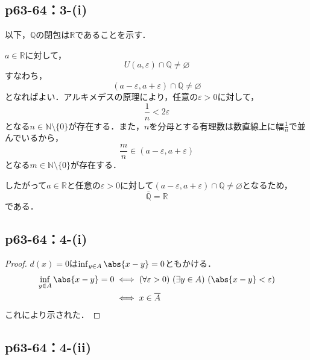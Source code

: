 \documentclass[a4paper,10pt,fleqn]{ltjsarticle}
\begin{document}
\subsection*{p63-64：3-(i)}

\begin{tleftbar}
    以下，$\mathbb{Q}$の閉包は$\mathbb{R}$であることを示す．

    $a \in \mathbb{R}$に対して，
    \[
    U(a,\varepsilon) \cap \mathbb{Q} \ne \varnothing
    \]
    すなわち，
    \[
        (a-\varepsilon,a+\varepsilon) \cap \mathbb{Q} \ne \varnothing
    \]
    となればよい．アルキメデスの原理により，任意の$\varepsilon >0$に対して，
    \[
        \frac{1}{n}< 2\varepsilon 
    \]
    となる$n \in \mathbb{N} \setminus \{0\}$が存在する．また，$n$を分母とする有理数は数直線上に幅$\frac{1}{n}$で並んでいるから，
    \[
        \frac{m}{n} \in (a-\varepsilon,a+\varepsilon)
    \]
    となる$ m \in \mathbb{N} \setminus \{0\}$が存在する．\par 
    したがって$a \in \mathbb{R}$と任意の$\varepsilon>0$に対して$(a-\varepsilon,a+\varepsilon) \cap \mathbb{Q} \ne \varnothing$となるため，
    \[
        \overline{\mathbb{Q}}=\mathbb{R}
    \]
    である．
\end{tleftbar}

\subsection*{p63-64：4-(i)}

\begin{tleftbar}
    \begin{proof}
            $d(x)=0$は$\inf_{y \in A} \abs{x-y} =0$ともかける．
            \begin{align*}
                \inf_{y \in A} \abs{x-y} =0 & \iff (\forall \varepsilon>0) \ (\exists y \in A)\ ( \abs{x-y}<\varepsilon ) \\
                & \iff x \in \overline{A}
            \end{align*}
            これにより示された．
        \end{proof}
    \end{tleftbar}


 \subsection*{p63-64：4-(ii)}
    
\end{document}
